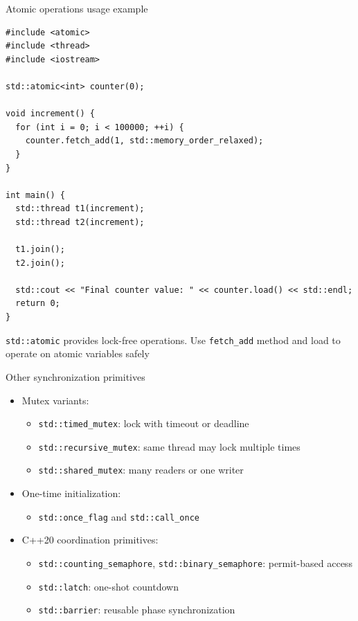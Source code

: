 \documentclass{beamer}
\begin{document}
\begin{frame}[fragile]{Atomic operations usage example}
  \lstset{style=CStyle}
  \begin{lstlisting}
#include <atomic>
#include <thread>
#include <iostream>

std::atomic<int> counter(0);

void increment() {
  for (int i = 0; i < 100000; ++i) {
    counter.fetch_add(1, std::memory_order_relaxed);
  }
}

int main() {
  std::thread t1(increment);
  std::thread t2(increment);

  t1.join();
  t2.join();

  std::cout << "Final counter value: " << counter.load() << std::endl;
  return 0;
}
  \end{lstlisting}
  \texttt{std::atomic} provides lock-free operations. Use \texttt{fetch\_add} method and load to operate on atomic variables safely
\end{frame}

\begin{frame}{Other synchronization primitives}
  \begin{itemize}
    \item Mutex variants:
      \begin{itemize}
        \item \texttt{std::timed\_mutex}: lock with timeout or deadline
        \item \texttt{std::recursive\_mutex}: same thread may lock multiple times
        \item \texttt{std::shared\_mutex}: many readers or one writer
      \end{itemize}
    \item One-time initialization:
      \begin{itemize}
        \item \texttt{std::once\_flag} and \texttt{std::call\_once}
      \end{itemize}
    \item C++20 coordination primitives:
      \begin{itemize}
        \item \texttt{std::counting\_semaphore}, \texttt{std::binary\_semaphore}: permit-based access
        \item \texttt{std::latch}: one-shot countdown
        \item \texttt{std::barrier}: reusable phase synchronization
      \end{itemize}
  \end{itemize}
\end{frame}
\end{document}
